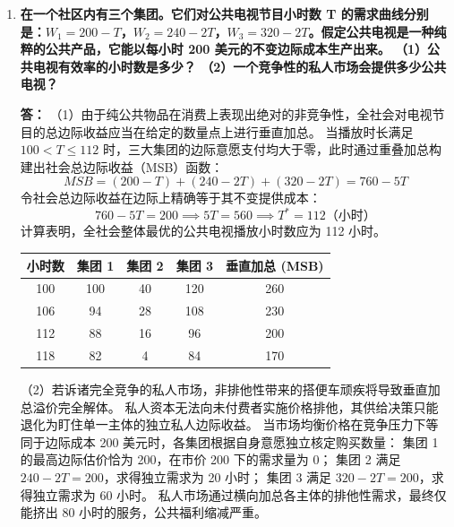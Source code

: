 \begin{enumerate}[label=\textbf{\arabic*.}, leftmargin=*]
		（3）引导产权纵向一体化合并是彻底化解该项配置扭曲的内在途径。
		通过将果园与养蜂场合并为单一的生态农业企业，原本外溢的授粉红利将直接在企业内部实现闭环。
		在维持独立主体的格局下，双方也可通过自愿签署附带约束的互惠契约，由果园主向养蜂人按蜂箱数量支付特定生态津贴，从而自发驱使微观产量收敛至全社会最优规模。
		
		\item \textbf{在一个社区内有三个集团。它们对公共电视节目小时数 T 的需求曲线分别是：$W_1 = 200 - T$，$W_2 = 240 - 2T$，$W_3 = 320 - 2T$。假定公共电视是一种纯粹的公共产品，它能以每小时 200 美元的不变边际成本生产出来。
			（1）公共电视有效率的小时数是多少？
			（2）一个竞争性的私人市场会提供多少公共电视？}
		
		\textbf{答：} （1）由于纯公共物品在消费上表现出绝对的非竞争性，全社会对电视节目的总边际收益应当在给定的数量点上进行垂直加总。
		当播放时长满足 $100 < T \le 112$ 时，三大集团的边际意愿支付均大于零，此时通过重叠加总构建出社会总边际收益（MSB）函数：
		\[
		MSB = (200 - T) + (240 - 2T) + (320 - 2T) = 760 - 5T
		\]
		令社会总边际收益在边际上精确等于其不变提供成本：
		\[
		760 - 5T = 200 \implies 5T = 560 \implies T^* = 112 \text{（小时）}
		\]
		计算表明，全社会整体最优的公共电视播放小时数应为 112 小时。
		
		\begin{center}
			\small
			\renewcommand{\arraystretch}{1.2}
			\setlength{\tabcolsep}{6pt}
			\begin{tabular}{ccccc}
				\hline
				小时数 & 集团 1 & 集团 2 & 集团 3 & 垂直加总 (MSB) \\ \hline
				100    & 100    & 40     & 120    & 260            \\
				106    & 94     & 28     & 108    & 230            \\
				112    & 88     & 16     & 96     & 200            \\
				118    & 82     & 4      & 84     & 170            \\ \hline
			\end{tabular}
		\end{center}
		
		（2）若诉诸完全竞争的私人市场，非排他性带来的搭便车顽疾将导致垂直加总溢价完全解体。
		私人资本无法向未付费者实施价格排他，其供给决策只能退化为盯住单一主体的独立私人边际收益。
		当市场均衡价格在竞争压力下等同于边际成本 200 美元时，各集团根据自身意愿独立核定购买数量：
		集团 1 的最高边际估价恰为 200，在市价 200 下的需求量为 0；
		集团 2 满足 $240 - 2T = 200$，求得独立需求为 20 小时；
		集团 3 满足 $320 - 2T = 200$，求得独立需求为 60 小时。
		私人市场通过横向加总各主体的排他性需求，最终仅能挤出 80 小时的服务，公共福利缩减严重。
		

\end{enumerate}
